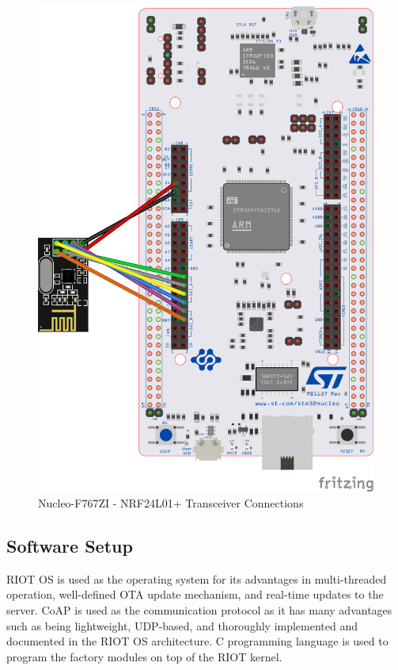 \begin{figure}
    \centering
    \includegraphics[scale=0.7, angle=270]{images/Nrf.png}
    \caption{Nucleo-F767ZI - NRF24L01+ Transceiver Connections}
    \label{fig:nrf}
\end{figure}

\subsection{Software Setup}

RIOT OS is used as the operating system for its advantages in multi-threaded operation, well-defined \acrshort{OTA} update mechanism, and real-time updates to the server. \acrshort{CoAP} is used as the communication protocol as it has many advantages such as being lightweight, UDP-based, and thoroughly implemented and documented in the RIOT OS architecture. C programming language is used to program the factory modules on top of the RIOT kernel.

